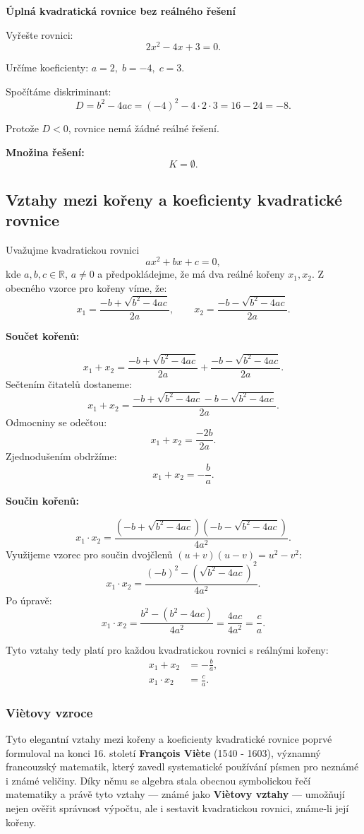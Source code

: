 \documentclass[12pt,a4paper]{article}
\begin{document}
\begin{examplebox}
\textbf{Úplná kvadratická rovnice bez reálného řešení}

Vyřešte rovnici:
\[
2x^2 - 4x + 3 = 0.
\]

Určíme koeficienty: \(a = 2,\; b = -4,\; c = 3.\)


Spočítáme diskriminant:
\[
D = b^2 - 4ac = (-4)^2 - 4 \cdot 2 \cdot 3 = 16 - 24 = -8.
\]

Protože \(D < 0\), rovnice nemá žádné reálné řešení.

\textbf{Množina řešení:}
\[
K = \emptyset.
\]
\end{examplebox}


\newpage
\subsection{Vztahy mezi kořeny a koeficienty kvadratické rovnice}

Uvažujme kvadratickou rovnici
\[
ax^2 + bx + c = 0,
\]
kde \(a, b, c \in \mathbb{R}\), \(a \neq 0\) a předpokládejme, že má dva reálné kořeny \(x_1, x_2\).  
Z obecného vzorce pro kořeny víme, že:
\[
x_1 = \frac{-b + \sqrt{b^2 - 4ac}}{2a}, \qquad x_2 = \frac{-b - \sqrt{b^2 - 4ac}}{2a}.
\]


\textbf{Součet kořenů:}

\[
x_1 + x_2 = \frac{-b + \sqrt{b^2 - 4ac}}{2a} + \frac{-b - \sqrt{b^2 - 4ac}}{2a}.
\]
Sečtením čitatelů dostaneme:
\[
x_1 + x_2 = \frac{-b + \sqrt{b^2 - 4ac} - b - \sqrt{b^2 - 4ac}}{2a}.
\]
Odmocniny se odečtou:
\[
x_1 + x_2 = \frac{-2b}{2a}.
\]
Zjednodušením obdržíme:
\[
x_1 + x_2 = -\frac{b}{a}.
\]


\textbf{Součin kořenů:}

\[
x_1 \cdot x_2 = \frac{\left(-b + \sqrt{b^2 - 4ac}\right)\left(-b - \sqrt{b^2 - 4ac}\right)}{4a^2}.
\]
Využijeme vzorec pro součin dvojčlenů \( (u+v)(u-v) = u^2 - v^2 \):
\[
x_1 \cdot x_2 = \frac{(-b)^2 - (\sqrt{b^2 - 4ac})^2}{4a^2}.
\]
Po úpravě:
\[
x_1 \cdot x_2 = \frac{b^2 - (b^2 - 4ac)}{4a^2} = \frac{4ac}{4a^2} = \frac{c}{a}.
\]

Tyto vztahy tedy platí pro každou kvadratickou rovnici s reálnými kořeny:
\[
\begin{aligned}
x_1 + x_2 &= -\frac{b}{a}, \\[6pt]
x_1 \cdot x_2 &= \frac{c}{a}.
\end{aligned}
\]


\subsubsection*{Viètovy vzroce}
Tyto elegantní vztahy mezi kořeny a koeficienty kvadratické rovnice poprvé formuloval na konci 16. století 
\textbf{François Viète} (1540 - 1603), významný francouzský matematik, 
který zavedl systematické používání písmen pro neznámé i známé veličiny.  
Díky němu se algebra stala obecnou symbolickou řečí matematiky a právě tyto vztahy —
 známé jako \textbf{Viètovy vztahy} — umožňují nejen ověřit správnost výpočtu, 
 ale i sestavit kvadratickou rovnici, známe-li její kořeny.
\end{document}
